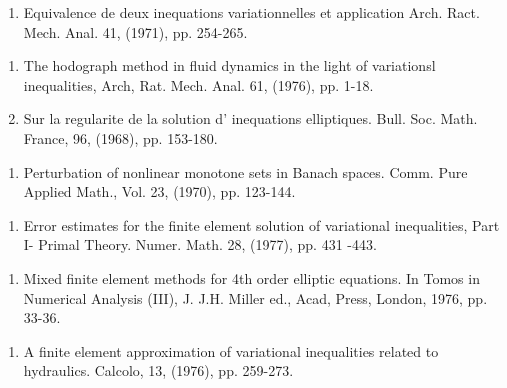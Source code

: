 \begin{thebibliography}{99}

  \begin{enumerate}
  \item  Equivalence de deux inequations variationnelles et
 application Arch. Ract. Mech. Anal. 41, (1971), pp. 254-265.\label{k15:e1} 
  \end{enumerate}


  \begin{enumerate}
  \item  The hodograph method in fluid dynamics in the light of
 variationsl inequalities, Arch, Rat. Mech. Anal. 61, (1976),
 pp. 1-18.\label{k16:e1} 

  \item Sur la regularite de la solution d' inequations
 elliptiques. Bull. Soc. Math. France, 96, (1968),
 pp. 153-180. \label{k16:e2} 
  \end{enumerate}


  \begin{enumerate}
  \item Perturbation of nonlinear monotone sets in Banach
 spaces. Comm. Pure Applied Math., Vol. 23, (1970), pp. 123-144.\label{k17:e1} 
  \end{enumerate}


  \begin{enumerate}
  \item Error estimates for the finite element solution of variational
 inequalities, Part I- Primal Theory. Numer. Math. 28, (1977),
 pp. 431 -443.\label{k18:e1} 
  \end{enumerate}


  \begin{enumerate}
  \item  Mixed finite element methods for 4th order elliptic
 equations. In Tomos in Numerical Analysis (III), J. J.H. Miller
 ed., Acad, Press, London, 1976, pp. 33-36.\label{k19:e1} 
  \end{enumerate}

\pageoriginale

  \begin{enumerate}
  \item A finite element approximation of variational inequalities
 related to hydraulics. Calcolo, 13, (1976), pp. 259-273.\label{k20:e1} 
  \end{enumerate}


\end{thebibliography}
